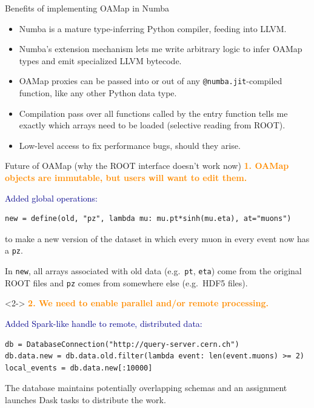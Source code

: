 \documentclass[aspectratio=169]{beamer}
\begin{document}
\begin{frame}{Benefits of implementing OAMap in Numba}
\vspace{0.5 cm} \large
\begin{itemize}\setlength{\itemsep}{0.4 cm}
\item Numba is a mature type-inferring Python compiler, feeding into LLVM.

\item Numba's extension mechanism lets me write arbitrary logic to infer OAMap types and emit specialized LLVM bytecode.

\item OAMap proxies can be passed into or out of any {\tt\small @numba.jit}-compiled function, like any other Python data type.

\item Compilation pass over all functions called by the entry function tells me exactly which arrays need to be loaded (selective reading from ROOT).

\item Low-level access to fix performance bugs, should they arise.
\end{itemize}
\end{frame}

\begin{frame}[fragile]{Future of OAMap (why the ROOT interface doesn't work now)}
\vspace{0.4 cm}\small
\textcolor{darkorange}{\normalsize\bf 1. OAMap objects are immutable, but users will want to edit them.}

\vspace{0.3 cm}
\textcolor{darkblue}{\normalsize Added global operations:}
\begin{verbatim}
new = define(old, "pz", lambda mu: mu.pt*sinh(mu.eta), at="muons")
\end{verbatim}
to make a new version of the dataset in which every muon in every event now has a {\tt\small pz}.

\vspace{0.1 cm}
In {\tt\small new}, all arrays associated with old data (e.g.\ {\tt\small pt}, {\tt\small eta}) come from the original ROOT files and {\tt\small pz} comes from somewhere else (e.g.\ HDF5 files).

\vspace{0.4 cm}
\begin{uncoverenv}<2->
\textcolor{darkorange}{\normalsize\bf 2. We need to enable parallel and/or remote processing.}

\vspace{0.3 cm}
\textcolor{darkblue}{\normalsize Added Spark-like handle to remote, distributed data:}
\begin{verbatim}
db = DatabaseConnection("http://query-server.cern.ch")
db.data.new = db.data.old.filter(lambda event: len(event.muons) >= 2)
local_events = db.data.new[:10000]
\end{verbatim}

\vspace{0.1 cm}
The database maintains potentially overlapping schemas and an assignment launches Dask tasks to distribute the work.
\end{uncoverenv}
\end{frame}
\end{document}
